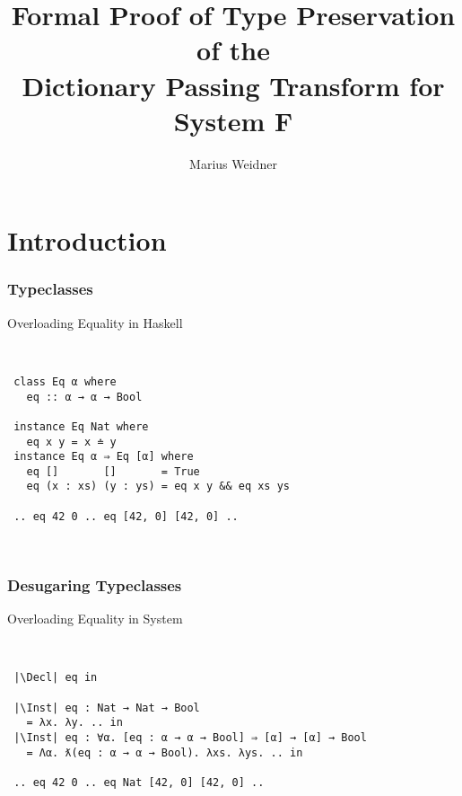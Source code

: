 \documentclass{beamer}
\title[Formal Dictionary Passing Transform]{Formal Proof of Type Preservation of the\\Dictionary Passing Transform for System F}
\institute[Uni Freiburg]{Chair of Programming Languages, University of Freiburg}
\author{Marius Weidner}
\begin{document}





\begin{frame}
  \titlepage
\end{frame}

\section{Introduction}

\begin{frame}[fragile]
  \frametitle{Typeclasses}
  \begin{block}{Overloading Equality in Haskell}
    \begin{center}
      ~
      \begin{verbatim}
 class Eq α where
   eq :: α → α → Bool
 
 instance Eq Nat where
   eq x y = x ≐ y
 instance Eq α ⇒ Eq [α] where
   eq []       []       = True
   eq (x : xs) (y : ys) = eq x y && eq xs ys 
     
 .. eq 42 0 .. eq [42, 0] [42, 0] ..
      \end{verbatim}
      ~
    \end{center}
  \end{block}
\end{frame}

\begin{frame}[fragile]
  \frametitle{Desugaring Typeclasses}
  \begin{block}{Overloading Equality in System \Fo}
    \begin{center}
      ~
      \begin{verbatim}
 |\Decl| eq in

 |\Inst| eq : Nat → Nat → Bool 
   = λx. λy. .. in
 |\Inst| eq : ∀α. [eq : α → α → Bool] ⇒ [α] → [α] → Bool 
   = Λα. ƛ(eq : α → α → Bool). λxs. λys. .. in
    
 .. eq 42 0 .. eq Nat [42, 0] [42, 0] .. 
      \end{verbatim}
      ~
    \end{center}
  \end{block}
\end{frame}
\end{document}
